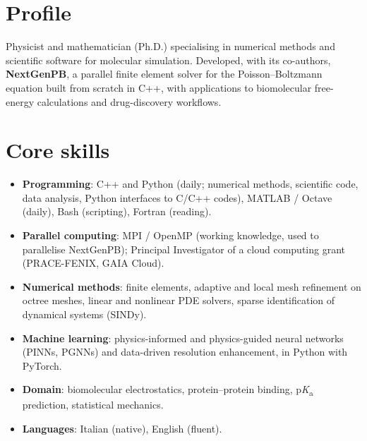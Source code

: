 \documentclass[10pt]{article}
\begin{document}

\section{Profile}
Physicist and mathematician (Ph.D.) specialising in numerical methods and scientific software for molecular simulation. Developed, with its co-authors, \textbf{NextGenPB}, a parallel finite element solver for the Poisson–Boltzmann equation built from scratch in C++, with applications to biomolecular free-energy calculations and drug-discovery workflows.

\section{Core skills}
\begin{itemize}
  \item \textbf{Programming}: C++ and Python (daily; numerical methods, scientific code, data analysis, Python interfaces to C/C++ codes), MATLAB / Octave (daily), Bash (scripting), Fortran (reading).
  \item \textbf{Parallel computing}: MPI / OpenMP (working knowledge, used to parallelise NextGenPB); Principal Investigator of a cloud computing grant (PRACE-FENIX, GAIA Cloud).
  \item \textbf{Numerical methods}: finite elements, adaptive and local mesh refinement on octree meshes, linear and nonlinear PDE solvers, sparse identification of dynamical systems (SINDy).
  \item \textbf{Machine learning}: physics-informed and physics-guided neural networks (PINNs, PGNNs) and data-driven resolution enhancement, in Python with PyTorch.
  \item \textbf{Domain}: biomolecular electrostatics, protein–protein binding, p\textit{K}\textsubscript{a} prediction, statistical mechanics.
  \item \textbf{Languages}: Italian (native), English (fluent).
\end{itemize}

\end{document}

